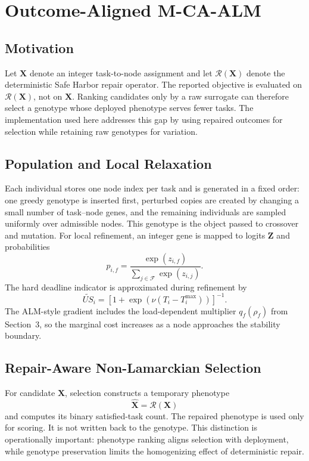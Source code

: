 \documentclass[pdflatex,sn-mathphys-num]{sn-jnl}
\begin{document}
\section{Outcome-Aligned M-CA-ALM}

\subsection{Motivation}
Let $\mathbf{X}$ denote an integer task-to-node assignment and let $\mathcal{R}(\mathbf{X})$ denote the deterministic Safe Harbor repair operator. The reported objective is evaluated on $\mathcal{R}(\mathbf{X})$, not on $\mathbf{X}$. Ranking candidates only by a raw surrogate can therefore select a genotype whose deployed phenotype serves fewer tasks. The implementation used here addresses this gap by using repaired outcomes for selection while retaining raw genotypes for variation.

\subsection{Population and Local Relaxation}
Each individual stores one node index per task and is generated in a fixed order: one greedy genotype is inserted first, perturbed copies are created by changing a small number of task--node genes, and the remaining individuals are sampled uniformly over admissible nodes. This genotype is the object passed to crossover and mutation. For local refinement, an integer gene is mapped to logits $\mathbf{Z}$ and probabilities
\begin{equation}
 p_{i,f}=\frac{\exp(z_{i,f})}{\sum_{j\in\mathcal{F}}\exp(z_{i,j})}.
\end{equation}
The hard deadline indicator is approximated during refinement by
\begin{equation}
 \widetilde{US}_i=\left[1+\exp\left(\nu(T_i-T_i^{\max})\right)\right]^{-1}.
\end{equation}
The ALM-style gradient includes the load-dependent multiplier $q_f(\rho_f)$ from Section~3, so the marginal cost increases as a node approaches the stability boundary.

\subsection{Repair-Aware Non-Lamarckian Selection}
For candidate $\mathbf{X}$, selection constructs a temporary phenotype
\begin{equation}
 \widehat{\mathbf{X}}=\mathcal{R}(\mathbf{X})
\end{equation}
and computes its binary satisfied-task count. The repaired phenotype is used only for scoring. It is not written back to the genotype. This distinction is operationally important: phenotype ranking aligns selection with deployment, while genotype preservation limits the homogenizing effect of deterministic repair.
\end{document}

